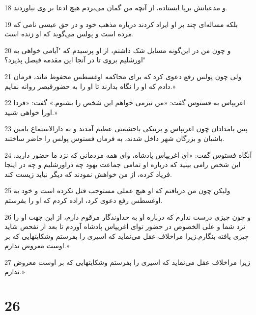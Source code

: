 \par 18 و مدعیانش برپا ایستاده، از آنچه من گمان می‌بردم هیچ ادعا بر وی نیاوردند.
\par 19 بلکه مساله‌ای چند بر او ایراد کردند درباره مذهب خود و در حق عیسی نامی که مرده است و پولس می‌گوید که او زنده است.
\par 20 و چون من در این‌گونه مسایل شک داشتم، از او پرسیدم که "آیامی خواهی به اورشلیم بروی تا در آنجا این مقدمه فیصل پذیرد؟"
\par 21 ولی چون پولس رفع دعوی کرد که برای محاکمه اوغسطس محفوظ ماند، فرمان دادم که او را نگاه بدارند تا او را به حضورقیصر روانه نمایم.»
\par 22 اغریپاس به فستوس گفت: «من نیزمی خواهم این شخص را بشنوم.» گفت: «فردا اورا خواهی شنید.»
\par 23 پس بامدادان چون اغریپاس و برنیکی باحشمتی عظیم آمدند و به دارالاستماع بامین باشیان و بزرگان شهر داخل شدند، به فرمان فستوس پولس را حاضر ساختند.
\par 24 آنگاه فستوس گفت: «ای اغریپاس پادشاه، و‌ای همه مردمانی که نزد ما حضور دارید، این شخص رامی بینید که درباره او تمامی جماعت یهود چه دراورشلیم و چه در اینجا فریاد کرده، از من خواهش نمودند که دیگر نباید زیست کند.
\par 25 ولیکن چون من دریافتم که او هیچ عملی مستوجب قتل نکرده است و خود به اوغسطس رفع دعوی کرد، اراده کردم که او را بفرستم.
\par 26 و چون چیزی درست ندارم که درباره او به خداوندگار مرقوم دارم، از این جهت او را نزد شما و علی الخصوص در حضور تو‌ای اغریپاس پادشاه آوردم تا بعد از تفحص شاید چیزی یافته بنگارم.زیرا مراخلاف عقل می‌نماید که اسیری را بفرستم وشکایتهایی که بر اوست معروض ندارم.»
\par 27 زیرا مراخلاف عقل می‌نماید که اسیری را بفرستم وشکایتهایی که بر اوست معروض ندارم.»

\chapter{26}

